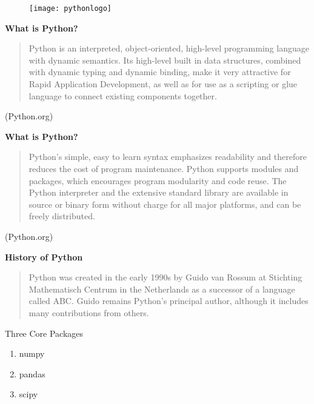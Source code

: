 \documentclass{beamer}
\begin{document}
  
  \begin{figure}
\centering
\texttt{[image: pythonlogo]}

\end{figure}

  
  
  
 \textbf{What is Python?}
 \begin{quote}
  Python is an interpreted, object-oriented, high-level programming language with dynamic semantics. Its high-level built in data structures, combined with dynamic typing and dynamic binding, make it very attractive for Rapid Application Development, as well as for use as a scripting or glue language to connect existing components together. 
 \end{quote}
 
 (Python.org)
  

  
   
   \textbf{What is Python?}
  \begin{quote}
   Python's simple, easy to learn syntax emphasizes readability and therefore reduces the cost of program maintenance. Python supports modules and packages, which encourages program modularity and code reuse. The Python interpreter and the extensive standard library are available in source or binary form without charge for all major platforms, and can be freely distributed.
  \end{quote}
   (Python.org)
  
 
   
  \textbf{History of Python}
  \begin{quote}
 Python was created in the early 1990s by Guido van Rossum at Stichting Mathematisch Centrum in the Netherlands as a successor of a language called ABC. Guido remains Python’s principal author, although it includes many contributions from others.
 \end{quote}
 







 
 \huge
Three Core Packages
\begin{enumerate}
\item numpy
\item pandas
\item scipy
\end{enumerate}
 








\end{document}
